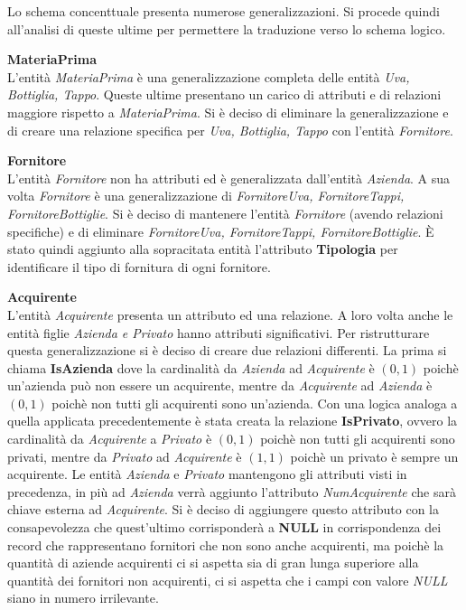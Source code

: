 Lo schema concenttuale presenta numerose generalizzazioni. Si procede quindi all'analisi di queste ultime per permettere la traduzione verso lo schema logico.
\begin{flushleft}
	\textbf{\large{MateriaPrima}}\\
	L'entità \emph{MateriaPrima} è una generalizzazione completa delle entità \emph{Uva, Bottiglia, Tappo}. Queste ultime presentano un carico di attributi e di relazioni maggiore rispetto a \emph{MateriaPrima}. Si è deciso di eliminare la generalizzazione e di creare una relazione specifica per \emph{Uva, Bottiglia, Tappo} con l'entità \emph{Fornitore}.
\end{flushleft}

\begin{flushleft}
	\textbf{\large{Fornitore}}\\
	L'entità \emph{Fornitore} non ha attributi ed è generalizzata dall'entità \emph{Azienda}. A sua volta \emph{Fornitore} è una generalizzazione di \emph{FornitoreUva, FornitoreTappi, FornitoreBottiglie}. Si è deciso di mantenere l'entità \emph{Fornitore} (avendo relazioni specifiche) e di eliminare \emph{FornitoreUva, FornitoreTappi, FornitoreBottiglie}. È stato quindi aggiunto alla sopracitata entità l'attributo \textbf{Tipologia} per identificare il tipo di fornitura di ogni fornitore.
\end{flushleft}


\begin{flushleft}
	\textbf{\large{Acquirente}}\\
	L'entità \emph{Acquirente} presenta un attributo ed una relazione. A loro volta anche le entità figlie \emph{Azienda e Privato} hanno attributi significativi. Per ristrutturare questa generalizzazione si è deciso di creare due relazioni differenti. La prima si chiama \textbf{IsAzienda} dove la cardinalità da \emph{Azienda} ad \emph{Acquirente} è $(0,1)$ poichè un'azienda può non essere un acquirente, mentre da \emph{Acquirente} ad \emph{Azienda} è $(0,1)$ poichè non tutti gli acquirenti sono un'azienda.
	Con una logica analoga a quella applicata precedentemente è stata creata la relazione \textbf{IsPrivato}, ovvero la cardinalità da \emph{Acquirente} a \emph{Privato} è $(0,1)$ poichè non tutti gli acquirenti sono privati, mentre da \emph{Privato} ad \emph{Acquirente} è $(1,1)$ poichè un privato è sempre un acquirente. Le entità \emph{Azienda} e \emph{Privato} mantengono gli attributi visti in precedenza, in più ad \emph{Azienda} verrà aggiunto l'attributo \emph{NumAcquirente} che sarà chiave esterna ad \emph{Acquirente}. Si è deciso di aggiungere questo attributo con la consapevolezza che quest'ultimo corrisponderà a \textbf{NULL} in corrispondenza dei record che rappresentano fornitori che non sono anche acquirenti, ma poichè la quantità di aziende acquirenti ci si aspetta sia di gran lunga superiore alla quantità dei fornitori non acquirenti, ci si aspetta che i campi con valore \emph{NULL} siano in numero irrilevante.
\end{flushleft}

